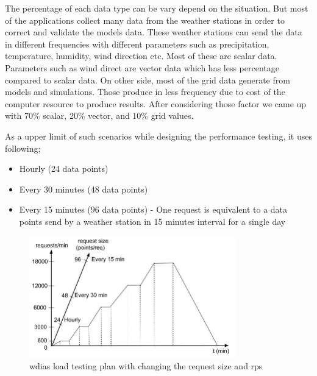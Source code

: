 The percentage of each data type can be vary depend on the situation. But most of the applications collect many data from the weather stations in order to correct and validate the models data. These weather stations can send the data in different frequencies with different parameters such as precipitation, temperature, humidity, wind direction etc.
Most of these are scalar data. Parameters such as wind direct are vector data which has less percentage compared to scalar data. On other side, most of the grid data generate from models and simulations. Those produce in less frequency due to cost of the computer resource to produce results. After considering those factor we came up with 70\% scalar, 20\% vector, and 10\% grid values.

As a upper limit of such scenarios while designing the performance testing, it uses following;
\begin{itemize}
    \item Hourly (24 data points) 
    \item Every 30 minutes (48 data points)
    \item Every 15 minutes (96 data points) - One request is equivalent to a data points send by a weather station in 15 minutes interval for a single day
\end{itemize}

\begin{figure}[htp]
    \centering
    \includegraphics[width=0.8\textwidth]{results/work_load/performance_study_v4.jpg}
    \caption{\acrshort{wdias} load testing plan with changing the request size and \acrshort{rps}}
    \label{fi:performance_study_load}
\end{figure}

